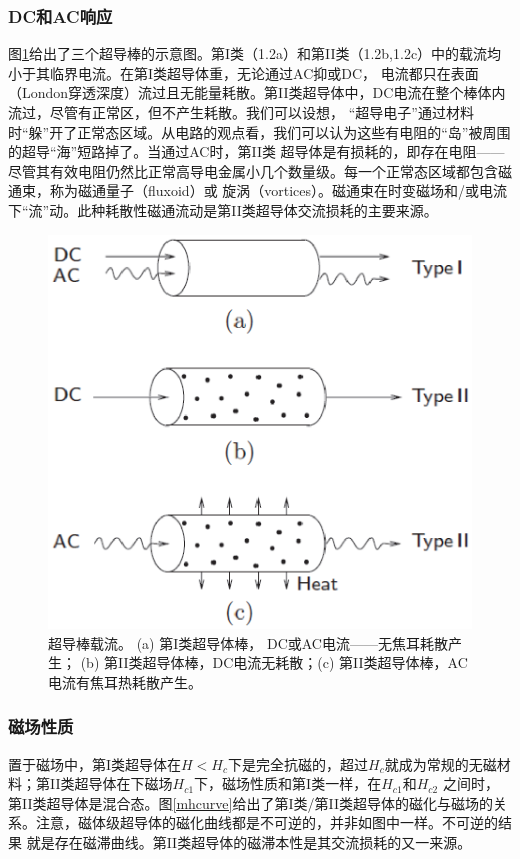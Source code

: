 \subsubsection{DC和AC响应}
图\ref{acdccurrent}给出了三个超导棒的示意图。第I类（1.2a）和第II类（1.2b,1.2c）中的载流均小于其临界电流。在第I类超导体重，无论通过AC抑或DC，
电流都只在表面（London穿透深度）流过且无能量耗散。第II类超导体中，DC电流在整个棒体内流过，尽管有正常区，但不产生耗散。我们可以设想，
“超导电子”通过材料时“躲”开了正常态区域。从电路的观点看，我们可以认为这些有电阻的“岛”被周围的超导“海”短路掉了。当通过AC时，第II类
超导体是有损耗的，即存在电阻——尽管其有效电阻仍然比正常高导电金属小几个数量级。每一个正常态区域都包含磁通束，称为磁通量子（fluxoid）或
旋涡（vortices）。磁通束在时变磁场和/或电流下“流”动。此种耗散性磁通流动是第II类超导体交流损耗的主要来源。

\begin{figure}
  \centering
 \includegraphics[scale=0.6]{chpt1/figs/fig1.2.eps}
  \caption{
超导棒载流。 (a) 第I类超导体棒， DC或AC电流——无焦耳耗散产生；
 (b) 第II类超导体棒，DC电流无耗散；(c) 第II类超导体棒，AC电流有焦耳热耗散产生。}\label{acdccurrent}
\end{figure}

\subsubsection{磁场性质}
置于磁场中，第I类超导体在$H<H_c$下是完全抗磁的，超过$H_c$就成为常规的无磁材料；第II类超导体在下磁场$H_{c1}$下，磁场性质和第I类一样，在$H_{c1}$和$H_{c2}$
之间时，第II类超导体是混合态。图\ref{mhcurve}给出了第I类/第II类超导体的磁化与磁场的关系。注意，磁体级超导体的磁化曲线都是不可逆的，并非如图中一样。不可逆的结果
就是存在磁滞曲线。第II类超导体的磁滞本性是其交流损耗的又一来源。

